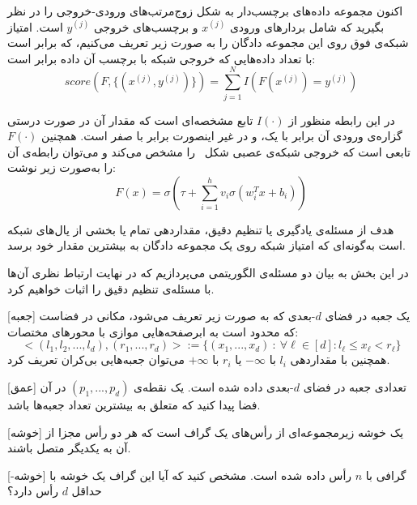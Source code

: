 اکنون مجموعه داده‌های برچسب‌دار به شکل زوج‌مرتب‌های ورودی-خروجی را در نظر بگیرید که شامل بردارهای ورودی $x^{(j)}$ و برچسب‌های خروجی $y^{(j)}$ است. امتیاز شبکه‌ی فوق روی این مجموعه دادگان را به صورت زیر تعریف می‌کنیم، که برابر است با تعداد داده‌هایی که خروجی شبکه با برچسب آن داده برابر است:
\begin{equation} \label{eq:loss}
	score(F, \{(x^{(j)}, y^{(j)})\}) = \sum_{j=1}^N I(F(x^{(j)}) = y^{(j)})
\end{equation}

در این رابطه منظور از $I(\cdot)$ تابع مشخصه‌ای است که مقدار آن در صورت درستی گزاره‌ی ورودی آن برابر با یک، و در غیر اینصورت برابر با صفر است. همچنین $F(\cdot)$ تابعی است که خروجی شبکه‌ی عصبی شکل~ را مشخص می‌کند و می‌توان رابطه‌ی آن را به‌صورت زیر نوشت:
\begin{equation*}
	F(x) = \sigma\left( \tau + \sum_{i=1}^h v_i \sigma(w_i^T x + b_i)\right)
\end{equation*}

هدف از مسئله‌ی یادگیری یا تنظیم دقیق، مقداردهی تمام یا بخشی از یال‌های شبکه است به‌گونه‌ای که امتیاز شبکه روی یک مجموعه دادگان به بیشترین مقدار خود برسد.



در این بخش به بیان دو مسئله‌ی الگوریتمی می‌پردازیم که در نهایت ارتباط نظری آن‌ها با مسئله‌ی تنظیم دقیق را اثبات خواهیم کرد.

[جعبه]
یک جعبه در فضای $d$-بعدی که به صورت زیر تعریف می‌شود، مکانی در فضاست که محدود است به ابرصفحه‌هایی موازی با محورهای مختصات:
\begin{equation*}
	<(l_1, l_2, ..., l_d), (r_1, ..., r_d)> := \{(x_1, ..., x_d) ~:~ \forall \ell \in [d] : l_\ell \le x_\ell < r_\ell\}
\end{equation*}
همچنین با مقداردهی $l_i$ با $-\infty$ یا $r_i$ با $+\infty$ می‌توان جعبه‌هایی بی‌کران تعریف کرد. 

[عمق]
تعدادی جعبه در فضای $d$-بعدی داده شده است. یک نقطه‌ی $(p_1, ..., p_d)$ در آن فضا پیدا کنید که متعلق به بیشترین تعداد جعبه‌ها باشد.


[خوشه]
یک خوشه زیرمجموعه‌ای از رأس‌های یک گراف  است که هر دو رأس مجزا از آن به یکدیگر متصل باشند.


[-خوشه]
گرافی با $n$ رأس داده شده است. مشخص کنید که آیا این گراف یک خوشه با حداقل $d$ رأس دارد؟


